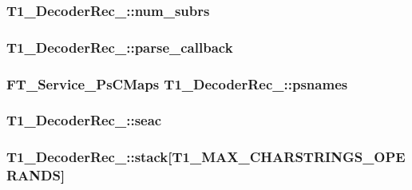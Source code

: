 \hypertarget{struct_t1___decoder_rec___ad72ad428733cb12fa7aa5979912ee1bc}{
\subsubsection[{num\-\_\-subrs}]{ T1\-\_\-\-Decoder\-Rec\-\_\-\-::num\-\_\-subrs}}\label{struct_t1___decoder_rec___ad72ad428733cb12fa7aa5979912ee1bc}
\hypertarget{struct_t1___decoder_rec___a840af0b01e7adb1e3aa521a936196b62}{
\subsubsection[{parse\-\_\-callback}]{ T1\-\_\-\-Decoder\-Rec\-\_\-\-::parse\-\_\-callback}}\label{struct_t1___decoder_rec___a840af0b01e7adb1e3aa521a936196b62}
\hypertarget{struct_t1___decoder_rec___ac1c3efd334618c670c6e2b975829e926}{
\subsubsection[{psnames}]{\setlength{\rightskip}{0pt plus 5cm}F\-T\-\_\-\-Service\-\_\-\-Ps\-C\-Maps T1\-\_\-\-Decoder\-Rec\-\_\-\-::psnames}}\label{struct_t1___decoder_rec___ac1c3efd334618c670c6e2b975829e926}
\hypertarget{struct_t1___decoder_rec___a45bf18b54ff973177ea3061ef0b705c6}{
\subsubsection[{seac}]{ T1\-\_\-\-Decoder\-Rec\-\_\-\-::seac}}\label{struct_t1___decoder_rec___a45bf18b54ff973177ea3061ef0b705c6}
\hypertarget{struct_t1___decoder_rec___af0def194d1b8f9b68f1750820a19bb3f}{
\subsubsection[{stack}]{ T1\-\_\-\-Decoder\-Rec\-\_\-\-::stack\mbox{[}{\bf T1\-\_\-\-M\-A\-X\-\_\-\-C\-H\-A\-R\-S\-T\-R\-I\-N\-G\-S\-\_\-\-O\-P\-E\-R\-A\-N\-D\-S}\mbox{]}}}\label{struct_t1___decoder_rec___af0def194d1b8f9b68f1750820a19bb3f}
